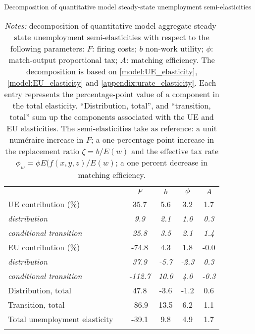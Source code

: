 \begin{table}[!h]
\centering
\caption{Decomposition of quantitative model steady-state unemployment semi-elasticities}
\label{tab:table_4}
\small
\begin{tabular}{l l c c c c}
\hline \hline
\addlinespace
 & \hspace{80pt}  & \hspace{12.5pt} $F$ \hspace{12.5pt}  & \hspace{12.5pt} $b$  \hspace{12.5pt} & \hspace{12.5pt} $\phi$ \hspace{12.5pt} & \hspace{12.5pt} $A$ \hspace{12.5pt} \\
\addlinespace
\addlinespace
UE contribution (\%)                               &   & 35.7 & 5.6 & 3.2 & 1.7 \\
\hspace{4pt}     \textit{distribution}             &   & \textit{9.9} &  \textit{2.1} &  \textit{1.0} &  \textit{0.3} \\
\hspace{4pt}     \textit{conditional transition}   &   & \textit{25.8} &  \textit{3.5} &  \textit{2.1} &  \textit{1.4} \\
\addlinespace
EU contribution (\%)                               &   & -74.8 & 4.3 & 1.8 & -0.0 \\
\hspace{4pt}     \textit{distribution}             &   & \textit{37.9} &  \textit{-5.7} &  \textit{-2.3} &  \textit{0.3} \\
\hspace{4pt}     \textit{conditional transition}   &   & \textit{-112.7} &  \textit{10.0} &  \textit{4.0} &  \textit{-0.3} \\
\addlinespace
Distribution, total                                  &   & 47.8 & -3.6 & -1.2 & 0.6 \\
Transition, total                                    &   & -86.9 & 13.5 & 6.2 & 1.1 \\
\addlinespace
Total unemployment elasticity                        &   & -39.1 & 9.8 & 4.9 & 1.7 \\
\addlinespace
\hline \hline
\end{tabular}
\caption*{\footnotesize{\textit{Notes:} decomposition of quantitative model aggregate steady-state unemployment semi-elasticities with respect to the following parameters: $F$: firing costs; $b$ non-work utility; $\phi$: match-output proportional tax; $A$: matching efficiency. The decomposition is based on \eqref{model:UE_elasticity}, \eqref{model:EU_elasticity} and \eqref{appendix:urate_elasticity}. Each entry represents the percentage-point value of a component in the total elasticity. ``Distribution, total'', and ``transition, total'' sum up the components associated with the UE and EU elasticities. The semi-elasticities take as reference: a unit numéraire increase in $F$; a one-percentage point increase in the replacement ratio $\zeta = b / E(w)$ and the effective tax rate $\phi_w = \phi E( f(x,y,z) / E(w)$; a one percent decrease in matching efficiency.}}
\end{table}